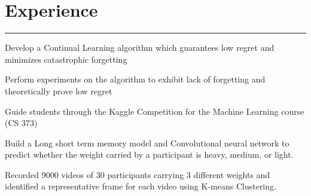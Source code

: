 \documentclass[]{sahana}
\begin{document}
\hfill
\begin{minipage}[t]{0.66\textwidth} 
\vspace{-4pt}
\section{Experience}
\noindent\rule{12.5cm}{0.4pt}
\vspace{-4pt}
\vspace{-1pt}
\noindent
\begin{tightemize}
\item Develop a Continual Learning algorithm which guarantees low regret and minimizes catastrophic forgetting
\item Perform experiments on the algorithm to exhibit lack of forgetting and theoretically prove low regret
\end{tightemize}
\sectionsep

\vspace{-3pt}
\vspace{-4pt}
\vspace{-7pt}
\noindent
\begin{tightemize}
\item Guide students through the Kaggle Competition for the Machine Learning course (CS 373)
\end{tightemize}
\sectionsep

\vspace{-3pt}
\vspace{-4pt}
\vspace{-4pt}
\noindent
\begin{tightemize}
\item Build a Long short term memory model and Convolutional neural network to predict whether the weight carried by a participant is heavy, medium, or light.
\item Recorded 9000 videos of 30 participants carrying 3 different weights and identified a representative frame for each video using K-means Clustering.
\end{tightemize}
\sectionsep


\end{minipage}
\end{document}
